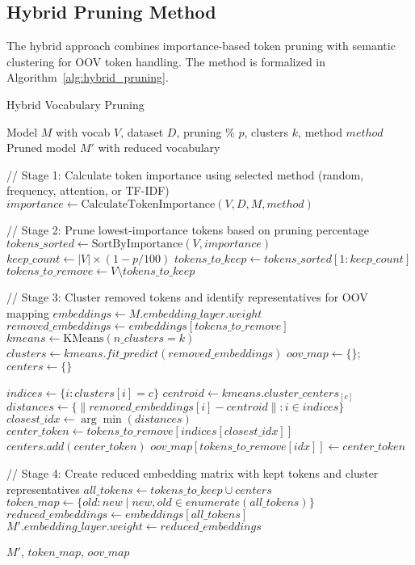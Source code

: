 \documentclass[twocolumn]{article}
\begin{document}
\subsection{Hybrid Pruning Method}
The hybrid approach combines importance-based token pruning with semantic clustering for OOV token handling. The method is formalized in Algorithm~\ref{alg:hybrid_pruning}.

\begin{algorithm}[H]
\caption{Hybrid Vocabulary Pruning}
\label{alg:hybrid_pruning}
\begin{algorithmic}[1]
\scriptsize
\Require Model $M$ with vocab $V$, dataset $D$, pruning \% $p$, clusters $k$, method $method$
\Ensure Pruned model $M'$ with reduced vocabulary

\State // Stage 1: Calculate token importance using selected method (random, frequency, attention, or TF-IDF)
\State $importance \gets \text{CalculateTokenImportance}(V, D, M, method)$

\State // Stage 2: Prune lowest-importance tokens based on pruning percentage
\State $tokens\_sorted \gets \text{SortByImportance}(V, importance)$
\State $keep\_count \gets |V| \times (1 - p/100)$
\State $tokens\_to\_keep \gets tokens\_sorted[1:keep\_count]$
\State $tokens\_to\_remove \gets V \setminus tokens\_to\_keep$

\State // Stage 3: Cluster removed tokens and identify representatives for OOV mapping
\State $embeddings \gets M.embedding\_layer.weight$
\State $removed\_embeddings \gets embeddings[tokens\_to\_remove]$
\State $kmeans \gets \text{KMeans}(n\_clusters=k)$
\State $clusters \gets kmeans.fit\_predict(removed\_embeddings)$
\State $oov\_map \gets \{\}$; $centers \gets \{\}$ 

    \State $indices \gets \{i : clusters[i] = c\}$
        \State $centroid \gets kmeans.cluster\_centers_[c]$
        \State $distances \gets \{\|removed\_embeddings[i] - centroid\| : i \in indices\}$
        \State $closest\_idx \gets \arg\min(distances)$ 
        \State $center\_token \gets tokens\_to\_remove[indices[closest\_idx]]$
        \State $centers.add(center\_token)$
            \State $oov\_map[tokens\_to\_remove[idx]] \gets center\_token$ 
        \EndFor
    \EndIf
\EndFor

\State // Stage 4: Create reduced embedding matrix with kept tokens and cluster representatives
\State $all\_tokens \gets tokens\_to\_keep \cup centers$
\State $token\_map \gets \{old: new \mid new, old \in enumerate(all\_tokens)\}$
\State $reduced\_embeddings \gets embeddings[all\_tokens]$
\State $M'.embedding\_layer.weight \gets reduced\_embeddings$

\State \Return $M'$, $token\_map$, $oov\_map$
\end{algorithmic}
\end{algorithm}
\end{document}
